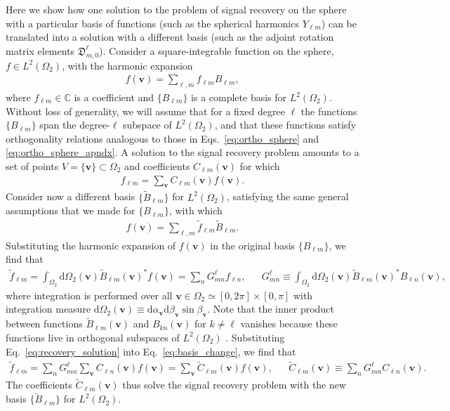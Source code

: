 \documentclass[notitlepage,twocolumn]{revtex4-2}
\newcommand{\p}[1]{\left(#1\right)} %
\renewcommand{\set}[1]{\{#1\}} %
\renewcommand{\v}{\bm} %
\newcommand{\1}{\mathds{1}}
\newcommand{\D}{\mathfrak{D}}
\renewcommand{\d}{\text{d}}
\newcommand{\CC}{\mathbb{C}}
\begin{document}
Here we show how one solution to the problem of signal recovery on the sphere with a particular basis of functions (such as the spherical harmonics $Y_{\ell m}$) can be translated into a solution with a different basis (such as the adjoint rotation matrix elements $\D^\ell_{m,0}$).
Consider a square-integrable function on the sphere, $f\in L^2\p{\Omega_2}$, with the harmonic expansion
\begin{align}
  f\p{\v v} = \sum_{\ell,m} f_{\ell m} B_{\ell m},
\end{align}
where $f_{\ell m}\in\CC$ is a coefficient and $\set{B_{\ell m}}$ is a complete basis for $L^2\p{\Omega_2}$.
Without loss of generality, we will assume that for a fixed degree $\ell$ the functions $\set{B_{\ell m}}$ span the degree-$\ell$ subspace of $L^2\p{\Omega_2}$, and that these functions satisfy orthogonality relations analogous to those in Eqs.~\eqref{eq:ortho_sphere} and \eqref{eq:ortho_sphere_apndx}.
A solution to the signal recovery problem amounts to a set of points $V=\set{\v v}\subset\Omega_2$ and coefficients $C_{\ell m}\p{\v v}$ for which
\begin{align}
  f_{\ell m} = \sum_{\v v} C_{\ell m}\p{\v v} f\p{\v v}.
  \label{eq:recovery_solution}
\end{align}
Consider now a different basis $\set{\tilde B_{\ell m}}$ for $L^2\p{\Omega_2}$, satisfying the same general assumptions that we made for $\set{B_{\ell m}}$, with which
\begin{align}
  f\p{\v v} = \sum_{\ell, m} \tilde f_{\ell m} \tilde B_{\ell m}.
\end{align}
Substituting the harmonic expansion of $f\p{\v v}$ in the original basis $\set{B_{\ell m}}$, we find that
\begin{align}
  \tilde f_{\ell m} = \int_{\Omega_2} \d\Omega_2\p{\v v}
  \tilde B_{\ell m}\p{\v v}^* f\p{\v v}
  = \sum_n G^\ell_{mn} f_{\ell n},
  &&
  G^\ell_{mn} \equiv \int_{\Omega_2} \d\Omega_2\p{\v v}
  \tilde B_{\ell m}\p{\v v}^* B_{\ell n}\p{\v v},
  \label{eq:basis_change}
\end{align}
where integration is performed over all $\v v\in\Omega_2\simeq[0,2\pi]\times[0,\pi]$ with integration measure $\d\Omega_2\p{\v v} \equiv \d\alpha_{\v v} \d\beta_{\v v} \sin\beta_{\v v}$.
Note that the inner product between functions $\tilde B_{\ell m}\p{\v v}$ and $B_{kn}\p{\v v}$ for $k\ne\ell$ vanishes because these functions live in orthogonal subspaces of $L^2\p{\Omega_2}$ \cite{freeden2008spherical}.
Substituting Eq.~\eqref{eq:recovery_solution} into Eq.~\eqref{eq:basis_change}, we find that
\begin{align}
  \tilde f_{\ell m}
  = \sum_n G^\ell_{mn} \sum_{\v v} C_{\ell n}\p{\v v} f\p{\v v}
  = \sum_{\v v} \tilde C_{\ell m}\p{\v v} f\p{\v v},
  &&
  \tilde C_{\ell m}\p{\v v} \equiv \sum_n G^\ell_{mn} C_{\ell n}\p{\v v}.
\end{align}
The coefficients $\tilde C_{\ell m}\p{\v v}$ thus solve the signal recovery problem with the new basis $\set{\tilde B_{\ell m}}$ for $L^2\p{\Omega_2}$.
\end{document}
